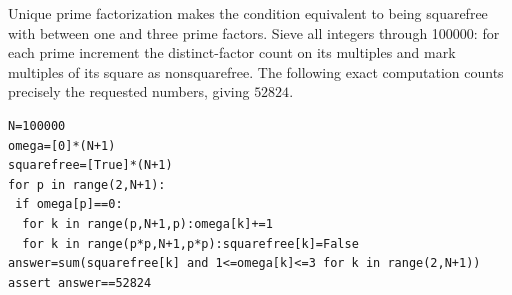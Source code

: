 Unique prime factorization makes the condition equivalent to being squarefree with between one and three prime factors. Sieve all integers through 100000: for each prime increment the distinct-factor count on its multiples and mark multiples of its square as nonsquarefree. The following exact computation counts precisely the requested numbers, giving $\boxed{52824}$.
\begin{verbatim}
N=100000
omega=[0]*(N+1)
squarefree=[True]*(N+1)
for p in range(2,N+1):
 if omega[p]==0:
  for k in range(p,N+1,p):omega[k]+=1
  for k in range(p*p,N+1,p*p):squarefree[k]=False
answer=sum(squarefree[k] and 1<=omega[k]<=3 for k in range(2,N+1))
assert answer==52824
\end{verbatim}
